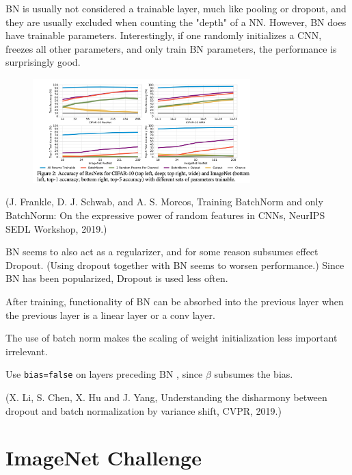 \documentclass{report}
\begin{document}
\begin{concept}
    BN is usually not considered a trainable layer, much like pooling or dropout, and they are usually excluded when counting the "depth" of a NN. However, BN does have trainable parameters. Interestingly, if one randomly initializes a CNN, freezes all other parameters, and only train BN parameters, the performance is surprisingly good.

    \begin{figure}[H]
        \centering
        \includegraphics[width=0.75\textwidth]{.././assets/6.14.png}
    \end{figure}

    (J. Frankle, D. J. Schwab, and A. S. Morcos, Training BatchNorm and only BatchNorm: On the expressive power of random features in CNNs, NeurIPS SEDL Workshop, 2019.)
\end{concept}

\begin{concept}[6.51][Discussion of BN]
    BN seems to also act as a regularizer, and for some reason subsumes effect Dropout. (Using dropout together with BN seems to worsen performance.) Since BN has been popularized, Dropout is used less often.

    After training, functionality of BN can be absorbed into the previous layer when the previous layer is a linear layer or a conv layer.

    The use of batch norm makes the scaling of weight initialization less important irrelevant.

    Use \verb|bias=false| on layers preceding BN , since $\beta$ subsumes the bias.

    (X. Li, S. Chen, X. Hu and J. Yang, Understanding the disharmony between dropout and batch normalization by variance shift, CVPR, 2019.)
\end{concept}

\chapter{ImageNet Challenge}
\end{document}
